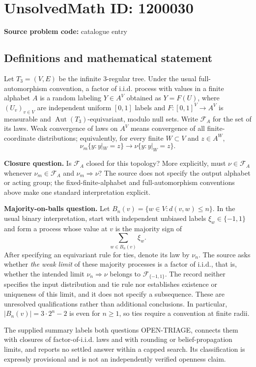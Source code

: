 \documentclass[11pt]{article}
\begin{document}
\section*{UnsolvedMath ID: 1200030}
\textbf{Source problem code:} catalogue entry
\subsection{Definitions and mathematical statement}
Let $T_3=(V,E)$ be the infinite $3$-regular tree. Under the usual full-automorphism convention, a factor of i.i.d. process with values in a finite alphabet $A$ is a random labeling $Y\in A^V$ obtained as $Y=F(U)$, where $(U_v)_{v\in V}$ are independent uniform $[0,1]$ labels and $F:[0,1]^V\to A^V$ is measurable and $\operatorname{Aut}(T_3)$-equivariant, modulo null sets. Write $\mathcal F_A$ for the set of its laws. Weak convergence of laws on $A^V$ means convergence of all finite-coordinate distributions; equivalently, for every finite $W\subset V$ and $z\in A^W$,
\[
 \nu_m\{y:y|_W=z\}\longrightarrow\nu\{y:y|_W=z\}.
\]

\textbf{Closure question.} Is $\mathcal F_A$ closed for this topology? More explicitly, must $\nu\in\mathcal F_A$ whenever $\nu_m\in\mathcal F_A$ and $\nu_m\Rightarrow\nu$? The source does not specify the output alphabet or acting group; the fixed-finite-alphabet and full-automorphism conventions above make one standard interpretation explicit.

\textbf{Majority-on-balls question.} Let $B_n(v)=\{w\in V:d(v,w)\leq n\}$. In the usual binary interpretation, start with independent unbiased labels $\xi_w\in\{-1,1\}$ and form a process whose value at $v$ is the majority sign of
\[
 \sum_{w\in B_n(v)}\xi_w.
\]
After specifying an equivariant rule for ties, denote its law by $\nu_n$. The source asks whether \emph{the weak limit} of these majority processes is a factor of i.i.d., that is, whether the intended limit $\nu_n\Rightarrow\nu$ belongs to $\mathcal F_{\{-1,1\}}$. The record neither specifies the input distribution and tie rule nor establishes existence or uniqueness of this limit, and it does not specify a subsequence. These are unresolved qualifications rather than additional conclusions. In particular, $|B_n(v)|=3\cdot2^n-2$ is even for $n\geq1$, so ties require a convention at finite radii.

The supplied summary labels both questions OPEN-TRIAGE, connects them with closures of factor-of-i.i.d. laws and with rounding or belief-propagation limits, and reports no settled answer within a capped search. Its classification is expressly provisional and is not an independently verified openness claim.
\end{document}
